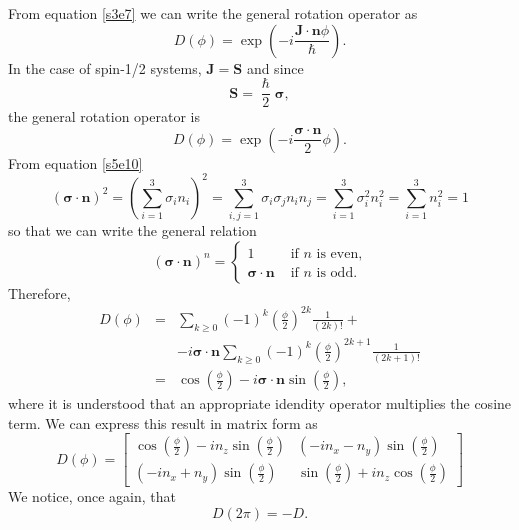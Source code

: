 \documentclass{article}
\numberwithin{equation}{section}
\let\vec\bm
\theoremstyle{plain}
\numberwithin{thm}{section}
\theoremstyle{plain}
\numberwithin{prop}{section}
\theoremstyle{definition}
\numberwithin{defn}{section}
\theoremstyle{remark}
\begin{document}
From equation \eqref{s3e7} we can write the general rotation operator as
\begin{equation}\label{s5e17}
D(\phi) = \exp\left(-i\frac{\vec{J}\cdot\vec{n}\phi}{\hslash}\right).
\end{equation}
In the case of spin-1/2 systems, $\vec{J} = \vec{S}$ and since
\begin{equation}\label{s5e18}
\vec{S} = \frac{\hslash}{2}\vec{\sigma},
\end{equation}
the general rotation operator is
\begin{equation}\label{s5e19}
D(\phi) = \exp\left(-i\frac{\vec{\sigma}\cdot\vec{n}}{2}\phi\right).
\end{equation}
From equation \eqref{s5e10}
\[
(\vec{\sigma}\cdot\vec{n})^2 = \left(\sum_{i=1}^3\sigma_i n_i\right)^2 = 
\sum_{i,j=1}^3\sigma_i\sigma_jn_i n_j = \sum_{i=1}^3\sigma_i^2n_i^2 = 
\sum_{i=1}^3n_i^2 = 1
\]
so that we can write the general relation
\begin{equation}\label{s5e20}
(\vec{\sigma}\cdot\vec{n})^n = \begin{cases}
1 & \text{ if } n \text{ is even,} \\
\vec{\sigma}\cdot\vec{n} & \text{ if } n \text{ is odd.}
\end{cases}
\end{equation}
Therefore,
\begin{eqnarray}
D(\phi) &=& \sum_{k \ge 0}(-1)^k\left(\frac{\phi}{2}\right)^{2k}\frac{1}{(2k)!}
 + \nonumber \\
 & & -i\vec{\sigma}\cdot\vec{n}
 \sum_{k \ge 0}(-1)^k\left(\frac{\phi}{2}\right)^{2k+1}\frac{1}{(2k+1)!} 
 \nonumber \\
 &=& \cos\left(\frac{\phi}{2}\right) - i\vec{\sigma}\cdot\vec{n}
     \sin\left(\frac{\phi}{2}\right), \label{s5e21}
\end{eqnarray}
where it is understood that an appropriate idendity operator multiplies the
cosine term. We can express this result in matrix form as
\begin{equation}\label{s5e22}
D(\phi) = \begin{bmatrix}
\cos\left(\frac{\phi}{2}\right) -in_z\sin\left(\frac{\phi}{2}\right) &
(-in_x -n_y)\sin\left(\frac{\phi}{2}\right) \\
(-in_x + n_y)\sin\left(\frac{\phi}{2}\right) &
\sin\left(\frac{\phi}{2}\right) + in_z\cos\left(\frac{\phi}{2}\right)
\end{bmatrix}
\end{equation}
We notice, once again, that
\begin{equation}\label{s5e23}
D(2\pi) = -D.
\end{equation}
\end{document}
